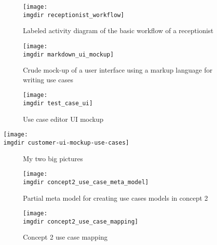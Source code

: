 \documentclass[aspectratio=43]{beamer}
\newcommand{\imgdir}{../Thesis/img/}
\begin{document}




\begin{figure}[ht]
\centering
\texttt{[image: \\imgdir receptionist\_workflow]}
\caption{Labeled activity diagram of the basic workflow of a receptionist}
\label{fig:receptionist-workflow}
\end{figure}


\begin{figure}[!htbp]
  \centering
  \texttt{[image: \\imgdir markdown\_ui\_mockup]}
  \caption{Crude mock-up of a user interface using a markup language for writing use cases}
\label{fig:markdown_ui_mockup}
\end{figure}

\begin{figure}[!htbp]
\texttt{[image: \\imgdir test\_case\_ui]}
\centering
\caption{Use case editor UI mockup}
\label{fig:use_case_editor_mockup}
\end{figure}

\texttt{[image: \\imgdir customer-ui-mockup-use-cases]}

\begin{figure}[ht]
\centering
{}\hfill
{}
\caption{My two big pictures}
\label{fig:subfigures}
\end{figure}

\begin{figure}[h]
  \centering
  \texttt{[image: \\imgdir concept2\_use\_case\_meta\_model]}
  \caption{Partial meta model for creating use cases models in concept 2}
  \label{fig:concept2_use_case_meta_model}
\end{figure}

\begin{figure}[!htbp]
  \centering
  \texttt{[image: \\imgdir concept2\_use\_case\_mapping]}
  \caption{Concept 2 use case mapping}
  \label{fig:concept2_use_case_mapping}
\end{figure}
\end{document}
